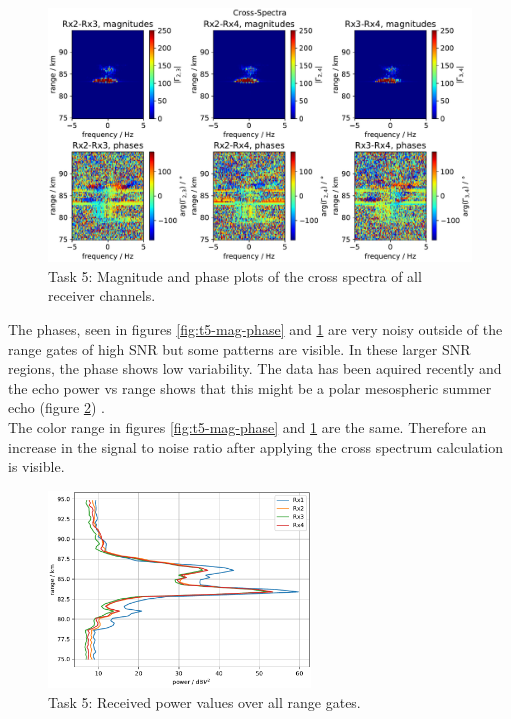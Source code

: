 \begin{figure}
    \begin{center}
        \includegraphics[width=\textwidth]{graphics/t5/t5-xspec-mag-phase.pdf}
    \end{center}
    \caption{Task 5: Magnitude and phase plots of the cross spectra of all receiver channels.}
    \label{fig:t5-xspec}
\end{figure}

The phases, seen in figures \ref{fig:t5-mag-phase} and \ref{fig:t5-xspec} are very noisy outside of the range gates of high SNR but some patterns are visible. In these larger SNR regions, the phase shows low variability. The data has been aquired recently and the echo power vs range shows that this might be a polar mesospheric summer echo (figure \ref{fig:t5-power}) \cite{pmse}.\\

The color range in figures \ref{fig:t5-mag-phase} and \ref{fig:t5-xspec} are the same. Therefore an increase in the signal to noise ratio after applying the cross spectrum calculation is visible.

\begin{figure}
    \begin{center}
        \includegraphics[width=0.62\textwidth]{graphics/t5/t5-power.pdf}
    \end{center}
    \caption{Task 5: Received power values over all range gates.}
    \label{fig:t5-power}
\end{figure}


